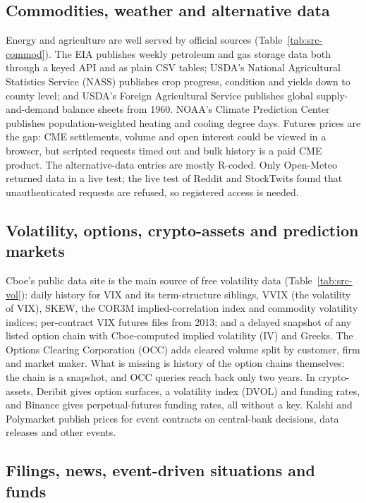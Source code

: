 \documentclass[10pt, a4paper, twocolumn]{article}
\begin{document}
\subsection{Commodities, weather and alternative data}

Energy and agriculture are well served by official sources (Table~\ref{tab:src-commod}). The EIA \cite{eia} publishes weekly petroleum and gas storage data both through a keyed API and as plain CSV tables; USDA's National Agricultural Statistics Service (NASS) \cite{usda} publishes crop progress, condition and yields down to county level; and USDA's Foreign Agricultural Service publishes global supply-and-demand balance sheets from 1960. NOAA's Climate Prediction Center publishes population-weighted heating and cooling degree days. Futures prices are the gap: CME settlements, volume and open interest could be viewed in a browser, but scripted requests timed out and bulk history is a paid CME product. The alternative-data entries are mostly R-coded. Only Open-Meteo returned data in a live test; the live test of Reddit and StockTwits found that unauthenticated requests are refused, so registered access is needed.

\subsection{Volatility, options, crypto-assets and prediction markets}

Cboe's public data site \cite{cboe} is the main source of free volatility data (Table~\ref{tab:src-vol}): daily history for VIX and its term-structure siblings, VVIX (the volatility of VIX), SKEW, the COR3M implied-correlation index and commodity volatility indices; per-contract VIX futures files from 2013; and a delayed snapshot of any listed option chain with Cboe-computed implied volatility (IV) and Greeks. The Options Clearing Corporation (OCC) \cite{occ} adds cleared volume split by customer, firm and market maker. What is missing is history of the option chains themselves: the chain is a snapshot, and OCC queries reach back only two years. In crypto-assets, Deribit \cite{deribit} gives option surfaces, a volatility index (DVOL) and funding rates, and Binance gives perpetual-futures funding rates, all without a key. Kalshi and Polymarket \cite{kalshi,poly} publish prices for event contracts on central-bank decisions, data releases and other events.

\subsection{Filings, news, event-driven situations and funds}
\end{document}
